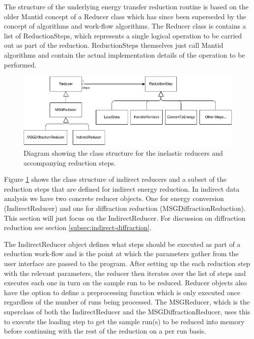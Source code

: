 \documentclass[paper=a4, fontsize=11pt]{scrartcl}	%
\numberwithin{equation}{section}															%
\numberwithin{figure}{section}																%
\numberwithin{table}{section}																%
\begin{document}
The structure of the underlying energy transfer reduction routine is based on the older Mantid concept of a Reducer class which has since been superseded by the concept of algorithms and work-flow algorithms. The Reducer class is contains a list of ReductionSteps, which represents a single logical operation to be carried out as part of the reduction. ReductionSteps themselves just call Mantid algorithms and contain the actual implementation details of the operation to be performed.

\begin{figure}[H]
\centering
\includegraphics[width=1\textwidth]{img/uml/class_diagrams/Reducer_structure.png}
\caption{Diagram showing the class structure for the inelastic reducers and accompanying reduction steps.}
\label{fig:reducer-structure-diagram}
\end{figure}

Figure \ref{fig:reducer-structure-diagram} shows the class structure of indirect reducers and a subset of the reduction steps that are defined for indirect energy reduction. In indirect data analysis we have two concrete reducer objects. One for energy conversion (IndirectReducer) and one for diffraction reduction (MSGDiffractionReduction). This section will just focus on the IndirectReducer. For discussion on diffraction reduction see section \ref{subsec:indirect-diffraction}.

The IndirectReducer object defines what steps should be executed as part of a reduction work-flow and is the point at which the parameters gather from the user interface are passed to the program. After setting up the each reduction step with the relevant parameters, the reducer then iterates over the list of steps and executes each one in turn on the sample run to be reduced. Reducer objects also have the option to define a preprocessing function which is only executed once regardless of the number of runs being processed. The MSGReducer, which is the superclass of both the IndirectReducer and the MSGDiffractionReducer, uses this to execute the loading step to get the sample run(s) to be reduced into memory before continuing with the rest of the reduction on a per run basis.
\end{document}
